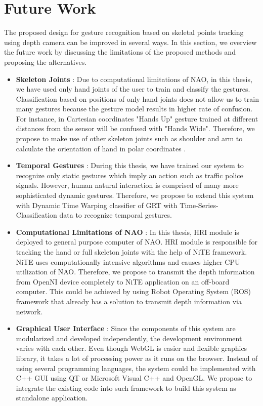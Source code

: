 \section{Future Work} The proposed design for gesture recognition based on skeletal points tracking using depth camera can be improved in several ways. In this section, we overview the future work by discussing the limitations of the proposed methods and proposing the alternatives.
\begin{itemize}
	\item \textbf{Skeleton Joints} : Due to computational limitations of NAO, in this thesis, we have used only hand joints of the user to train and classify the gestures. Classification based on positions of only hand joints does not allow us to train many gestures because the gesture model results in higher rate of confusion. For instance, in Cartesian coordinates "Hands Up" gesture trained at different distances from the sensor will be confused with "Hands Wide". Therefore, we propose to make use of other skeleton joints such as shoulder and arm to calculate the orientation of hand in polar coordinates \cite{22}.	
	
	\item \textbf{Temporal Gestures} : During this thesis, we have trained our system to recognize only static gestures which imply an action such as traffic police signals. However, human natural interaction is comprised of many more sophisticated dynamic gestures. Therefore, we propose to extend this system with Dynamic Time Warping classifier of GRT with Time-Series-Classification data to recognize temporal gestures. 
	
	\item \textbf{Computational Limitations of NAO} : In this thesis, HRI module is deployed to general purpose computer of NAO. HRI module is responsible for tracking the hand or full skeleton joints with the help of NiTE framework. NiTE uses computationally intensive algorithms and causes higher CPU utilization of NAO. Therefore, we propose to transmit the depth information from OpenNI device completely to NiTE application on an off-board computer. This could be achieved by using Robot Operating System (ROS) framework that already has a solution to transmit depth information via network.
		
	\item \textbf{Graphical User Interface} : Since the components of this system are modularized and developed independently, the development environment varies with each other. Even though WebGL is easier and flexible graphics library, it takes a lot of processing power as it runs on the browser. Instead of using several programming languages, the system could be implemented with C++ GUI using QT or Microsoft Visual C++ and OpenGL. We propose to integrate the existing code into such framework to build this system as standalone application. 
	

\end{itemize}
